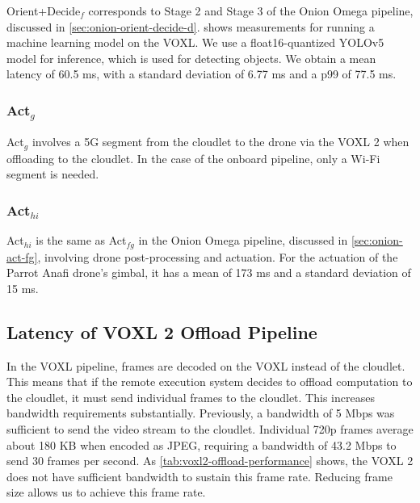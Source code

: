 Orient+Decide$_f$ corresponds to Stage 2 and Stage 3 of the Onion Omega pipeline, discussed in \cref{sec:onion-orient-decide-d}.  shows measurements for running a machine learning model on the VOXL. We use a float16-quantized YOLOv5 model for inference, which is used for detecting objects. We obtain a mean latency of 60.5 ms, with a standard deviation of 6.77 ms and a p99 of 77.5 ms.

\subsubsection*{Act$_{g}$}

Act$_g$ involves a 5G segment from the cloudlet to the drone via the VOXL 2 when offloading to the cloudlet. In the case of the onboard pipeline, only a Wi-Fi segment is needed.

\subsubsection*{Act$_{hi}$}

Act$_{hi}$ is the same as Act$_{fg}$ in the Onion Omega pipeline, discussed in \cref{sec:onion-act-fg}, involving drone post-processing and actuation. For the actuation of the Parrot Anafi drone's gimbal, it has a mean of 173 ms and a standard deviation of 15 ms.

\subsection{Latency of VOXL 2 Offload Pipeline}

In the VOXL pipeline, frames are decoded on the VOXL instead of the cloudlet.
This means that if the remote execution system decides to offload computation
to the cloudlet, it must send individual frames to the cloudlet. This increases
bandwidth requirements substantially. Previously, a bandwidth of 5 Mbps was
sufficient to send the video stream to the cloudlet. Individual 720p frames
average about 180 KB when encoded as JPEG, requiring a bandwidth of 43.2 Mbps
to send 30 frames per second.  As \cref{tab:voxl2-offload-performance} shows,
the VOXL 2 does not have sufficient bandwidth to sustain this frame rate.
Reducing frame size allows us to achieve this frame rate.

